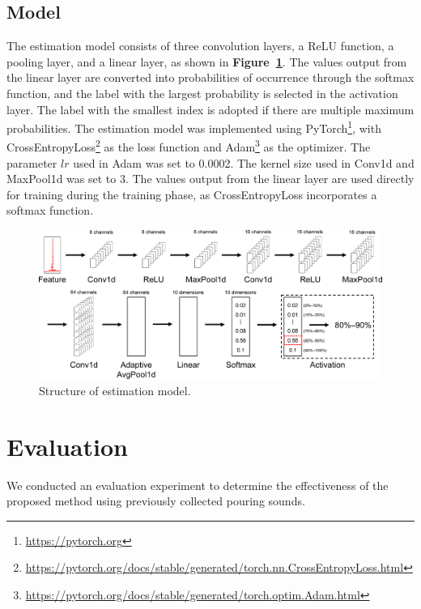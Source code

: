 \documentclass[sigconf]{acmart}
\newcommand\figref[1]{\textbf{Figure~\ref{fig:#1}}}
\begin{document}
\subsection{Model}
The estimation model consists of three convolution layers, a ReLU function, a pooling layer, and a linear layer, as shown in \figref{model}. The values output from the linear layer are converted into probabilities of occurrence through the softmax function, and the label with the largest probability is selected in the activation layer. The label with the smallest index is adopted if there are multiple maximum probabilities. The estimation model was implemented using PyTorch\footnote{\url{https://pytorch.org}}, with CrossEntropyLoss\footnote{\url{https://pytorch.org/docs/stable/generated/torch.nn.CrossEntropyLoss.html}} as the loss function and Adam\footnote{\url{https://pytorch.org/docs/stable/generated/torch.optim.Adam.html}} as the optimizer. The parameter $lr$ used in Adam was set to 0.0002. The kernel size used in Conv1d and MaxPool1d was set to 3. The values output from the linear layer are used directly for training during the training phase, as CrossEntropyLoss incorporates a softmax function.

\begin{figure}[!t]
  \centering
  \includegraphics[width=0.8\linewidth]{figures/model.eps}
  \caption{Structure of estimation model.}
  \label{fig:model}
\end{figure}



\section{Evaluation}
\label{sec:evaluation}
We conducted an evaluation experiment to determine the effectiveness of the proposed method using previously collected pouring sounds.

\end{document}
